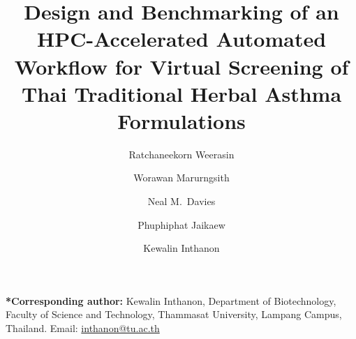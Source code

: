 \documentclass[11pt,a4paper]{article}
\begin{document}
\title{\textbf{Design and Benchmarking of an HPC-Accelerated Automated Workflow for Virtual Screening of Thai Traditional Herbal Asthma Formulations}}

\author[1]{Ratchaneekorn Weerasin}
\author[1]{Worawan Marurngsith}
\author[2]{Neal M.\ Davies}
\author[3]{Phuphiphat Jaikaew}
\author[4,*]{Kewalin Inthanon}


\date{}

\maketitle
\thispagestyle{fancy}

\noindent\textbf{*Corresponding author:} Kewalin Inthanon, Department of Biotechnology, Faculty of Science and Technology, Thammasat University, Lampang Campus, Thailand. Email: \href{mailto:inthanon@tu.ac.th}{inthanon@tu.ac.th}
\end{document}
